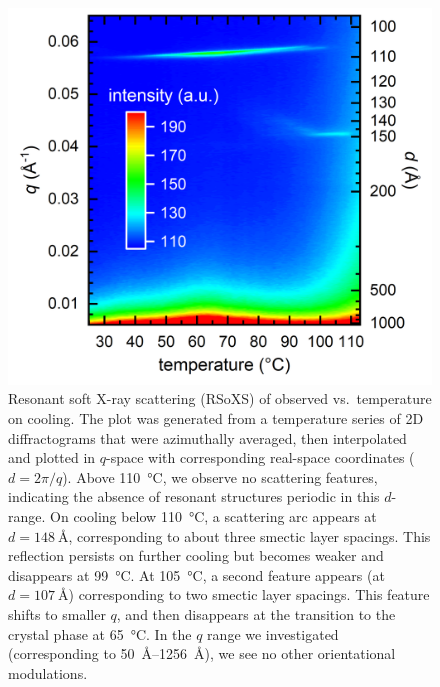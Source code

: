 \begin{figure}[h!]
    \centering
    \includegraphics[width=.8\textwidth]{./figs/pal30/finalFigs/PAL30RSOXSshiftedTcontourplotv1mt.png}
    \caption{\label{fig:rsoxs-main} Resonant soft X-ray scattering (RSoXS) of  observed
        vs.\ temperature on
    cooling. The plot was generated
    from a temperature series of 2D diffractograms that were azimuthally
    averaged, then interpolated and plotted in $q$-space with corresponding real-space coordinates
    ($d=2\pi/q$). Above \SI{110}{\degreeCelsius}, we
    observe no scattering features, indicating the absence of resonant structures periodic in
    this $d$-range. On cooling below \SI{110}{\degreeCelsius}, a scattering arc
    appears at $d=\SI{148}{\angstrom}$, corresponding to  about three smectic layer
    spacings.
    This reflection persists on further cooling but becomes weaker and
    disappears
    at \SI{99}{\degreeCelsius}. At
    \SI{105}{\degreeCelsius}, a second feature appears (at $d =
    \SI{107}{\angstrom}$)
    corresponding to two smectic layer spacings. This feature
    shifts to smaller $q$, and then disappears at the transition to the
    crystal phase at \SI{65}{\degreeCelsius}. In the $q$ range we investigated
    (corresponding to \SIrange{50}{1256}{\angstrom}), we see no other orientational modulations.}
\end{figure}

